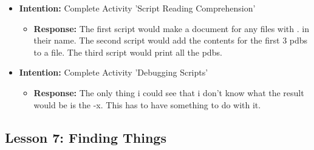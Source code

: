 \documentclass{article}
\begin{document}
\begin{itemize}
\begin{itemize}
\end{itemize}

\item{\textbf{Intention:} Complete Activity 'Script Reading Comprehension'}

\begin{itemize}

\item{\textbf{Response:} The first script would make a document for any files with . in their name. The second script would add the contents for the first 3 pdbs to a file. The third script would print all the pdbs.}

\end{itemize}

\item{\textbf{Intention:} Complete Activity 'Debugging Scripts'}

\begin{itemize}
\item{\textbf{Response:} The only thing i could see that i don't know what the result would be is the -x. This has to have something to do with it.}


\end{itemize}


\end{itemize}


\subsection{ Lesson 7: Finding Things}
\end{document}
